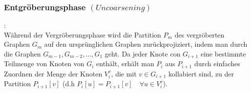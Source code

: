 \documentclass[runningheads]{llncs}
\begin{document}
\subsubsection{Entgröberungsphase $(Uncoarsening)$}:\\[8pt]
Während der Vergröberungsphase wird die Partition $P_m$ des vergröberten Graphen $G_m$ auf den ursprünglichen Graphen zurückprojiziert, indem man durch die Graphen $G_{m-1}, G_{m-2}, \ldots, G_1$ geht. Da jeder Knote con $G_{i+1}$ eine bestimmte Teilmenge von Knoten von $G_i$ enthält, erhält man $P_i$ aus $P_{i+1}$ durch einfaches Zuordnen der Menge der Knoten $V_{i}^{v}$, die mit $v \in G_{i+1}$ kollabiert sind, zu der Partition $P_{i+1}[v]$ (d.h $P_{i}[u] = P_{i+1}[v] \quad \forall u \in V_{i}^{v}$).   




\printbibliography
\end{document}
